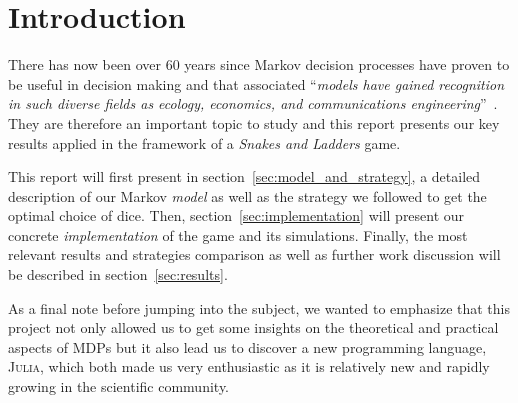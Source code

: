 \section{Introduction} %
\label{sec:introduction}
There has now been over 60 years since Markov decision processes have proven to
be useful in decision making and that associated \enquote{\textit{models have 
gained recognition in such diverse fields as ecology, economics,
and communications engineering}}~\cite{puterman2014markov}.
They are therefore an important topic to study and this report presents
our key results applied in the framework of a \emph{Snakes and Ladders} game.

This report will first present in section~\ref{sec:model_and_strategy},
a detailed description of our Markov \emph{model}
as well as the strategy we followed to get the optimal choice of dice.
Then, section~\ref{sec:implementation} will present our concrete \emph{implementation}
of the game and its simulations.
Finally, the most relevant results and strategies comparison as well as
further work discussion will be described in section~\ref{sec:results}.

As a final note before jumping into the subject, we wanted to
emphasize that this project not only allowed us to get some
insights on the theoretical and practical aspects of MDPs
but it also lead us to discover a new programming language, \textsc{Julia},
which both made us very enthusiastic as it is relatively new
and rapidly growing in the scientific community.


